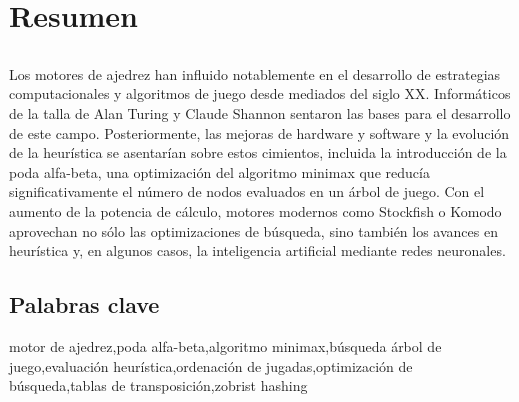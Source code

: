 \chapter*{Resumen}

\section*{\tituloPortadaVal}

Los motores de ajedrez han influido notablemente en el desarrollo de estrategias computacionales y algoritmos de juego desde mediados del siglo XX. Informáticos de la talla de Alan Turing y Claude Shannon sentaron las bases para el desarrollo de este campo. Posteriormente, las mejoras de hardware y software y la evolución de la heurística se asentarían sobre estos cimientos, incluida la introducción de la poda alfa-beta, una optimización del algoritmo minimax que reducía significativamente el número de nodos evaluados en un árbol de juego. Con el aumento de la potencia de cálculo, motores modernos como Stockfish o Komodo aprovechan no sólo las optimizaciones de búsqueda, sino también los avances en heurística y, en algunos casos, la inteligencia artificial mediante redes neuronales.

\section*{Palabras clave}
   
\noindent motor de ajedrez,poda alfa-beta,algoritmo minimax,búsqueda árbol de juego,evaluación heurística,ordenación de jugadas,optimización de búsqueda,tablas de transposición,zobrist hashing

   


